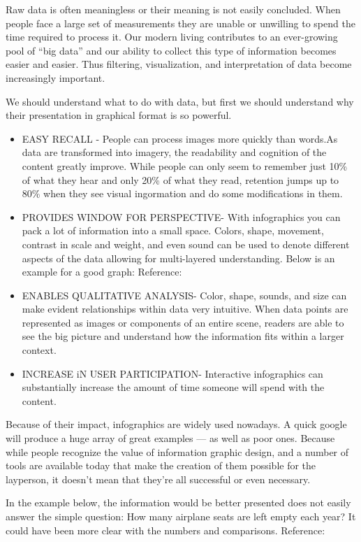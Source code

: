 \documentclass[]{book}
\theoremstyle{definition}
\theoremstyle{definition}
\theoremstyle{definition}
\theoremstyle{remark}
\begin{document}
Raw data is often meaningless or their meaning is not easily concluded.
When people face a large set of measurements they are unable or
unwilling to spend the time required to process it. Our modern living
contributes to an ever-growing pool of ``big data'' and our ability to
collect this type of information becomes easier and easier. Thus
filtering, visualization, and interpretation of data become increasingly
important.

We should understand what to do with data, but first we should
understand why their presentation in graphical format is so powerful.

\begin{itemize}
\item
  EASY RECALL - People can process images more quickly than words.As
  data are transformed into imagery, the readability and cognition of
  the content greatly improve. While people can only seem to remember
  just 10\% of what they hear and only 20\% of what they read, retention
  jumps up to 80\% when they see visual ingormation and do some
  modifications in them.
\item
  PROVIDES WINDOW FOR PERSPECTIVE- With infographics you can pack a lot
  of information into a small space. Colors, shape, movement, contrast
  in scale and weight, and even sound can be used to denote different
  aspects of the data allowing for multi-layered understanding. Below is
  an example for a good graph: Reference: \citep{image_good}
\item
  ENABLES QUALITATIVE ANALYSIS- Color, shape, sounds, and size can make
  evident relationships within data very intuitive. When data points are
  represented as images or components of an entire scene, readers are
  able to see the big picture and understand how the information fits
  within a larger context.
\item
  INCREASE iN USER PARTICIPATION- Interactive infographics can
  substantially increase the amount of time someone will spend with the
  content.
\end{itemize}

Because of their impact, infographics are widely used nowadays. A quick
google will produce a huge array of great examples --- as well as poor
ones. Because while people recognize the value of information graphic
design, and a number of tools are available today that make the creation
of them possible for the layperson, it doesn't mean that they're all
successful or even necessary.

In the example below, the information would be better presented does not
easily answer the simple question: How many airplane seats are left
empty each year? It could have been more clear with the numbers and
comparisons. Reference: \citep{image_bad}
\end{document}
